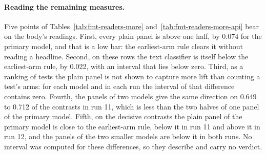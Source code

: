 \paragraph{Reading the remaining measures.} Five points of Tables~\ref{tab:fmt-readers-more} and~\ref{tab:fmt-readers-more-api} bear on the body's readings. First, every plain panel is above one half, by 0.074 for the primary model, and that is a low bar: the earliest-arm rule clears it without reading a headline. Second, on these rows the text classifier is itself below the earliest-arm rule, by 0.022, with an interval that lies below zero. Third, as a ranking of tests the plain panel is not shown to capture more lift than counting a test's arms: for each model and in each run the interval of that difference contains zero. Fourth, the panels of two models give the same direction on 0.649 to 0.712 of the contrasts in run 11, which is less than the two halves of one panel of the primary model. Fifth, on the decisive contrasts the plain panel of the primary model is close to the earliest-arm rule, below it in run 11 and above it in run 12, and the panels of the two smaller models are below it in both runs. No interval was computed for these differences, so they describe and carry no verdict.
